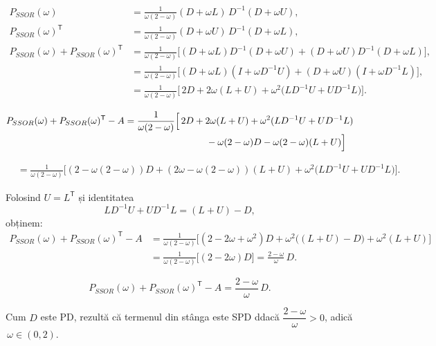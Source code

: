 \begin{demonstratie}
    \begin{align*}
        P_{SSOR}(\omega) &=\frac{1}{\omega(2-\omega)}(D+\omega L)\,D^{-1}(D+\omega U),\\[0.4em]
        P_{SSOR}(\omega)^{\mathsf T} &=\frac{1}{\omega(2-\omega)}(D+\omega U)\,D^{-1}(D+\omega L),\\[0.6em]
        P_{SSOR}(\omega)+P_{SSOR}(\omega)^{\mathsf T} &=\frac{1}{\omega(2-\omega)}\Big[(D+\omega L)D^{-1}(D+\omega U) +(D+\omega U)D^{-1}(D+\omega L)\Big],\\[0.6em]
        &=\frac{1}{\omega(2-\omega)} \Big[(D+\omega L)(I+\omega D^{-1}U) +(D+\omega U)(I+\omega D^{-1}L)\Big],\\[0.6em]
        &=\frac{1}{\omega(2-\omega)} \Big[\,2D+2\omega(L+U)+\omega^2\!\big(LD^{-1}U+UD^{-1}L\big)\Big].
    \end{align*}

    \begin{align*}
        P_{SSOR}(\omega)+P_{SSOR}(\omega)^{\mathsf T}-A
        &=\frac{1}{\omega(2-\omega)}
        \Big[\,2D+2\omega(L+U)+\omega^2(LD^{-1}U+UD^{-1}L)\\[-0.2em]
        &\hspace{8.7em}-\omega(2-\omega)D-\omega(2-\omega)(L+U)\Big]
    \end{align*}

    \begin{align*}
        &=\frac{1}{\omega(2-\omega)}
        \Big[(2-\omega(2-\omega))D
        +(2\omega-\omega(2-\omega))(L+U)
        +\omega^2\!\big(LD^{-1}U+UD^{-1}L\big)\Big].
    \end{align*}

    Folosind $U=L^{\mathsf T}$ și identitatea
    $$
    LD^{-1}U+UD^{-1}L=(L+U)-D,
    $$
    obținem:
    \begin{align*}
        P_{SSOR}(\omega)+P_{SSOR}(\omega)^{\mathsf T}-A &= \frac{1}{\omega(2-\omega)} \Big[(2-2\omega+\omega^2)D+\omega^2\big((L+U)-D\big)+\omega^2(L+U)\Big]\\[0.3em]
        &=\frac{1}{\omega(2-\omega)}\Big[(2-2\omega)D\Big] = \frac{2-\omega}{\omega}\,D.
    \end{align*}

    $$
    \boxed{P_{SSOR}(\omega) + P_{SSOR}(\omega)^{\mathsf T} - A = \dfrac{2 - \omega}{\omega}\,D.}
    $$

    Cum $D$ este PD, rezultă că termenul din stânga este SPD ddacă $\dfrac{2-\omega}{\omega}>0$, adică \,$\omega\in(0,2)$.
\end{demonstratie}

